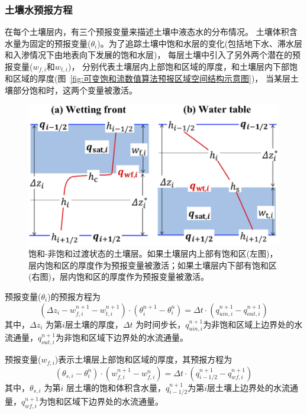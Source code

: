 \subsubsection{土壤水预报方程}
在每个土壤层内，有三个预报变量来描述土壤中液态水的分布情况。
土壤体积含水量为固定的预报变量($\theta_i$)。为了追踪土壤中饱和水层的变化(包括地下水、滞水层和入渗情况下由地表向下发展的饱和水层)，
每层土壤中引入了另外两个潜在的预报变量($w_{f,i}$和$w_{t,i}$)，
分别代表土壤层内上部饱和区域的厚度，和土壤层内下部饱和区域的厚度(图~\ref{fig:可变饱和流数值算法预报区域空间结构示意图})，
当某层土壤部分饱和时，这两个变量被激活。
{
\begin{figure}[htbp]
\centering
\includegraphics{Figures/陆地表面的水分循环/饱和-非饱和过渡状态的土壤层.png}
\caption{饱和-非饱和过渡状态的土壤层。如果土壤层内上部有饱和区(左图)，
层内饱和区的厚度作为预报变量被激活；如果土壤层内下部有饱和区(右图)，层内饱和区的厚度作为预报变量被激活。}
\label{fig:饱和-非饱和过渡状态的土壤层}
\end{figure}
}


预报变量($\theta_i$)的预报方程为
\begin{equation}\label{si_in1}
\left(\Delta z_{i}-w_{f, i}^{n+1}-w_{t, i}^{n+1}\right) \cdot\left(\theta_{i}^{n+1}-\theta_{i}^{n}\right)=\Delta t \cdot\left(q_{ {uin,i }}^{n+1}-q_{ {out }, i}^{n+1}\right)
\end{equation}
其中，$\Delta z_i$ 为第$ i $层土壤的厚度，$\Delta t$ 为时间步长，$q_{uin,i}^{n+1}$为非饱和区域上边界处的水流通量，$q_{out,i}^{n+1}$为非饱和区域下边界处的水流通量。


预报变量($w_{f,i}$)表示土壤层上部饱和区域的厚度，其预报方程为
\begin{equation}\label{si_in2}
\left(\theta_{s, i}-\theta_{i}^{n}\right) \cdot\left(w_{f, i}^{n+1}-w_{f, i}^{n}\right)=\Delta t \cdot\left(q_{i-1/2}^{n+1}-q_{w f, i}^{n+1}\right)
\end{equation}
其中，$\theta_{s,i}$ 为第$ i$ 层土壤的饱和体积含水量，$ q_{{i-1/2}}^{n+1}$为第$i$层土壤上边界处的水流通量，$q_{wf,i}^{n+1}$为饱和区域下边界处的水流通量。


